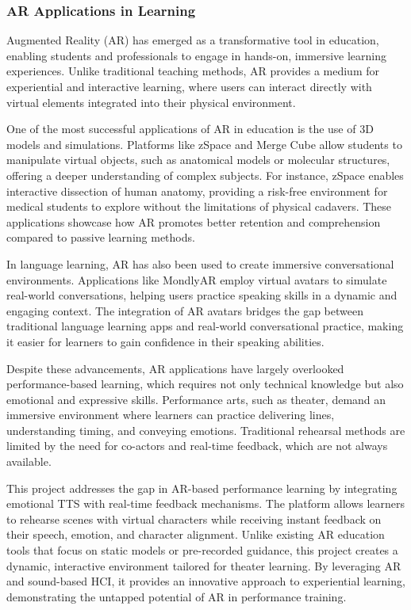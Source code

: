 \subsubsection{AR Applications in Learning}
Augmented Reality (AR) has emerged as a transformative tool in education, enabling students and professionals to engage in hands-on, immersive learning experiences. Unlike traditional teaching methods, AR provides a medium for experiential and interactive learning, where users can interact directly with virtual elements integrated into their physical environment.

One of the most successful applications of AR in education is the use of 3D models and simulations. Platforms like zSpace and Merge Cube allow students to manipulate virtual objects, such as anatomical models or molecular structures, offering a deeper understanding of complex subjects. For instance, zSpace enables interactive dissection of human anatomy, providing a risk-free environment for medical students to explore without the limitations of physical cadavers. These applications showcase how AR promotes better retention and comprehension compared to passive learning methods.

In language learning, AR has also been used to create immersive conversational environments. Applications like MondlyAR employ virtual avatars to simulate real-world conversations, helping users practice speaking skills in a dynamic and engaging context. The integration of AR avatars bridges the gap between traditional language learning apps and real-world conversational practice, making it easier for learners to gain confidence in their speaking abilities.

Despite these advancements, AR applications have largely overlooked performance-based learning, which requires not only technical knowledge but also emotional and expressive skills. Performance arts, such as theater, demand an immersive environment where learners can practice delivering lines, understanding timing, and conveying emotions. Traditional rehearsal methods are limited by the need for co-actors and real-time feedback, which are not always available.

This project addresses the gap in AR-based performance learning by integrating emotional TTS with real-time feedback mechanisms. The platform allows learners to rehearse scenes with virtual characters while receiving instant feedback on their speech, emotion, and character alignment. Unlike existing AR education tools that focus on static models or pre-recorded guidance, this project creates a dynamic, interactive environment tailored for theater learning. By leveraging AR and sound-based HCI, it provides an innovative approach to experiential learning, demonstrating the untapped potential of AR in performance training.

